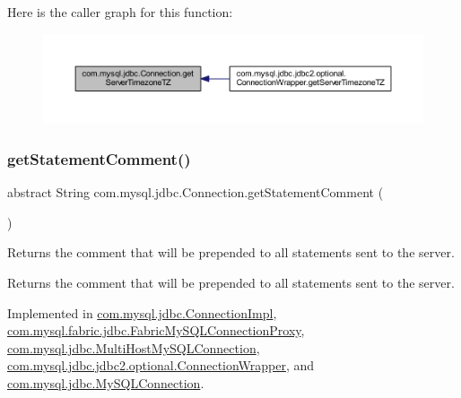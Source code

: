 Here is the caller graph for this function\+:\nopagebreak
\begin{figure}[H]
\begin{center}
\leavevmode
\includegraphics[width=350pt]{interfacecom_1_1mysql_1_1jdbc_1_1_connection_aa824ea2a868be95bd6a21119445838b8_icgraph}
\end{center}
\end{figure}
\mbox{\label{interfacecom_1_1mysql_1_1jdbc_1_1_connection_a9db688dc671cce2bd98b3f34128981f8}} 
\subsubsection{\texorpdfstring{get\+Statement\+Comment()}{getStatementComment()}}
{\footnotesize\ttfamily abstract String com.\+mysql.\+jdbc.\+Connection.\+get\+Statement\+Comment (\begin{DoxyParamCaption}{ }\end{DoxyParamCaption})\hspace{0.3cm}{\ttfamily [abstract]}}

Returns the comment that will be prepended to all statements sent to the server.

\begin{DoxyReturn}{Returns}
the comment that will be prepended to all statements sent to the server. 
\end{DoxyReturn}


Implemented in \mbox{\hyperlink{classcom_1_1mysql_1_1jdbc_1_1_connection_impl_af8522a313fec84a2460afa40889e3595}{com.\+mysql.\+jdbc.\+Connection\+Impl}}, \mbox{\hyperlink{classcom_1_1mysql_1_1fabric_1_1jdbc_1_1_fabric_my_s_q_l_connection_proxy_aac900a94d9228e2b4f0c50cacee5feeb}{com.\+mysql.\+fabric.\+jdbc.\+Fabric\+My\+S\+Q\+L\+Connection\+Proxy}}, \mbox{\hyperlink{classcom_1_1mysql_1_1jdbc_1_1_multi_host_my_s_q_l_connection_a9d4bbb42860206a659b53b3d5441fac3}{com.\+mysql.\+jdbc.\+Multi\+Host\+My\+S\+Q\+L\+Connection}}, \mbox{\hyperlink{classcom_1_1mysql_1_1jdbc_1_1jdbc2_1_1optional_1_1_connection_wrapper_a14a98d8f5aed8168fbb25a76210e9878}{com.\+mysql.\+jdbc.\+jdbc2.\+optional.\+Connection\+Wrapper}}, and \mbox{\hyperlink{interfacecom_1_1mysql_1_1jdbc_1_1_my_s_q_l_connection_aca7bbebb7ec6fa745218e6dca38cfaad}{com.\+mysql.\+jdbc.\+My\+S\+Q\+L\+Connection}}.

